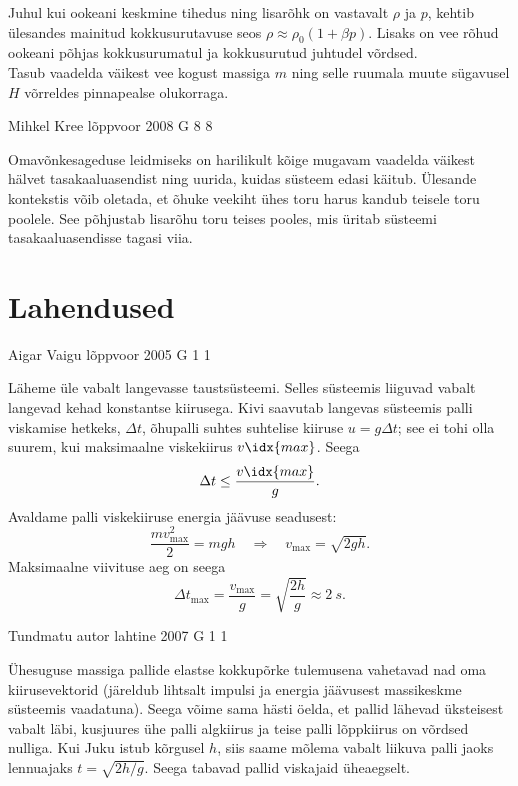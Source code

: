 \documentclass[11pt]{article}
\begin{document}
{{\ifHint
\osa Juhul kui ookeani keskmine tihedus ning lisarõhk on vastavalt $\rho$ ja $p$, kehtib ülesandes mainitud kokkusurutavuse seos $\rho \approx \rho_0 ( 1 + \beta p)$. Lisaks on vee rõhud ookeani põhjas kokkusurumatul ja kokkusurutud juhtudel võrdsed.\\
\osa Tasub vaadelda väikest vee kogust massiga $m$ ning selle ruumala muute sügavusel $H$ võrreldes pinnapealse olukorraga.
\fi
}

{Mihkel Kree} %
{lõppvoor} %
{2008} %
{G 8} %
{8} %
{

\ifHint
Omavõnkesageduse leidmiseks on harilikult kõige mugavam vaadelda väikest hälvet tasakaaluasendist ning uurida, kuidas süsteem edasi käitub. Ülesande kontekstis võib oletada, et õhuke veekiht ühes toru harus kandub teisele toru poolele. See põhjustab lisarõhu toru teises pooles, mis üritab süsteemi tasakaaluasendisse tagasi viia.
\fi
}
\newpage\section{Lahendused}
        \ToggleSolution
        
{Aigar Vaigu} %
{lõppvoor} %
{2005} %
{G 1} %
{1} %
{

\ifSolution
Läheme üle vabalt langevasse taustsüsteemi. Selles süsteemis liiguvad vabalt langevad kehad konstantse kiirusega. Kivi saavutab langevas süsteemis palli viskamise hetkeks, $\Delta t$, õhupalli suhtes suhtelise kiiruse $u = g\Delta t$; see ei tohi olla suurem, kui maksimaalne viskekiirus $v\idx{max}$. Seega
\[
\Delta t \leq \frac{v\idx{max}}{g}.
\]
Avaldame palli viskekiiruse energia jäävuse seadusest:
\[
\frac{m v_{\max }^{2}}{2}=m g h \quad \Rightarrow \quad v_{\max }=\sqrt{2 g h}.
\]
Maksimaalne viivituse aeg on seega
\[
\Delta t_{\max }=\frac{v_{\max }}{g}=\sqrt{\frac{2 h}{g}} \approx \SI{2}{s}.
\]
\fi
}

{Tundmatu autor} %
{lahtine} %
{2007} %
{G 1} %
{1} %
{

\ifSolution
Ühesuguse massiga pallide elastse kokkupõrke tulemusena vahetavad nad oma
kiirusevektorid (järeldub lihtsalt impulsi ja energia jäävusest massikeskme süsteemis vaadatuna). Seega võime sama hästi öelda, et pallid lähevad üksteisest vabalt läbi, kusjuures ühe palli algkiirus ja teise palli lõppkiirus on võrdsed nulliga. Kui Juku istub kõrgusel $h$, siis saame mõlema vabalt liikuva palli jaoks lennuajaks $t = \sqrt{2h/g}$. Seega tabavad pallid viskajaid üheaegselt. 

}}
\end{document}
